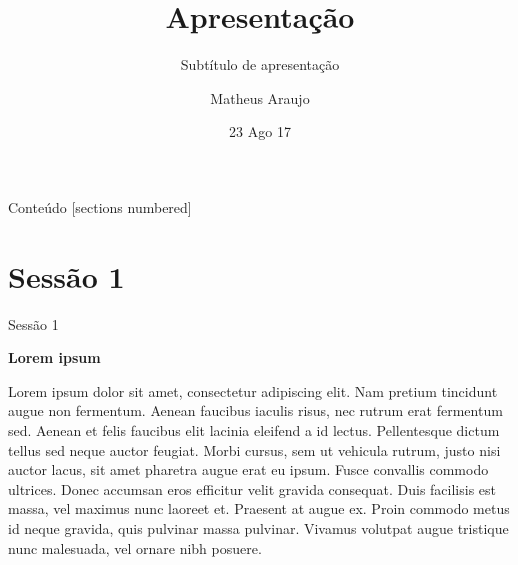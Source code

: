 \documentclass[10pt]{beamer}
\title{Apresentação}
\subtitle{Subtítulo de apresentação}
\date{23 Ago 17}
\author{Matheus Araujo}
\institute{Universidade Federal de Minas Gerais}
\begin{document}
\maketitle

\begin{frame}{Conteúdo}
  [sections numbered]
  \tableofcontents[hideallsubsections]
\end{frame}

\section{Sessão 1}

\begin{frame}{Sessão 1}

\textbf{Lorem ipsum}

Lorem ipsum dolor sit amet, consectetur adipiscing elit. Nam pretium tincidunt augue non fermentum. Aenean faucibus iaculis risus, nec rutrum erat fermentum sed. Aenean et felis faucibus elit lacinia eleifend a id lectus. Pellentesque dictum tellus sed neque auctor feugiat. Morbi cursus, sem ut vehicula rutrum, justo nisi auctor lacus, sit amet pharetra augue erat eu ipsum. Fusce convallis commodo ultrices. Donec accumsan eros efficitur velit gravida consequat. Duis facilisis est massa, vel maximus nunc laoreet et. Praesent at augue ex. Proin commodo metus id neque gravida, quis pulvinar massa pulvinar. Vivamus volutpat augue tristique nunc malesuada, vel ornare nibh posuere. 

\end{frame}
\end{document}
